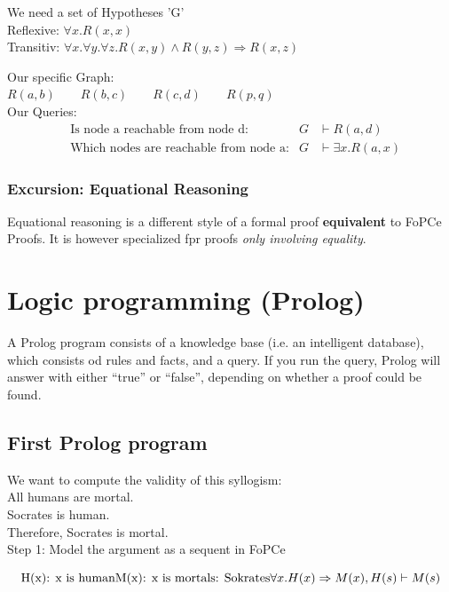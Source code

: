 We need a set of Hypotheses 'G' \\
Reflexive: $\forall x. R(x,x)$ \\
Transitiv: $\forall x.\forall y.\forall z. R(x,y) \land R(y,z) \Rightarrow R(x,z)$

Our specific Graph:\\
$R(a,b) \qquad R(b,c) \qquad R(c,d) \qquad R(p,q)$\\

Our Queries: \\
\begin{align*}
	&\text{Is node a reachable from node d:} &G &\vdash R(a,d)\\
	&\text{Which nodes are reachable from node a:} &G &\vdash \exists x.R(a,x)
\end{align*}

\subsubsection{Excursion: Equational Reasoning}
Equational reasoning is a different style of a formal proof \textbf{equivalent} to FoPCe Proofs. It is however specialized fpr proofs \emph{only involving equality}.

\section{Logic programming (Prolog)}
A Prolog program consists of a knowledge base (i.e. an intelligent database), which consists od rules and facts, and a query.
If you run the query, Prolog will answer with either “true” or “false”, depending on whether a proof could be found.
\subsection{First Prolog program}
We want to compute the validity of this syllogism: \\
All humans are mortal. \\
Socrates is human. \\
Therefore, Socrates is mortal.\\
Step 1: Model the argument as a sequent in FoPCe

\[
\text{H(x): x is human}\\
\text{M(x): x is mortal}\\
\text{s: Sokrates}\\
\forall x.H(x) \Rightarrow M(x),H(s) \vdash M(s)
\]


